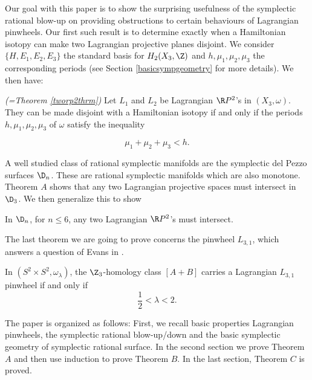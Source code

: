 Our goal with this paper is to show the surprising usefulness of the symplectic rational blow-up on providing obstructions to certain behaviours of Lagrangian pinwheels. Our first such result is to determine exactly when a Hamiltonian isotopy can make two Lagrangian projective planes disjoint. We consider $\{H,E_1,E_2,E_3\}$ the standard basis for $H_2(X_3,\Z)$ and $h,\mu_1,\mu_2,\mu_3$ the corresponding periods (see Section \ref{basicsympgeometry} for more details).  We then have:


\begin{thrma}\emph{(=Theorem \ref{tworp2thrm})}
Let $L_1$ and $L_2$ be Lagrangian $\R P^2$'s in $(X_3,\omega)$. They can be made disjoint with a Hamiltonian isotopy if and only if the periods $h,\mu_1,\mu_2,\mu_3$ of $\omega$ satisfy the inequality

\[\mu_1+\mu_2+\mu_3<h.\]
\end{thrma}



A well studied class of rational symplectic manifolds are the symplectic del Pezzo surfaces $\D_n$. These are rational symplectic manifolds which are also monotone. Theorem $A$ shows that any two Lagrangian projective spaces must intersect in $\D_3$. We then generalize this to show

\begin{thrmb}[= Theorem \ref{delpezzothrm}]
In $\D_n$, for $n\leq 6$, any two Lagrangian $\R P^2$'s must intersect.
\end{thrmb}



The last theorem we are going to prove concerns the pinwheel $L_{3,1}$, which answers a question of Evans in \cite{evans_2023}.

\begin{thrmc}[=Theorem \ref{jquestion}]
In $(S^2\times S^2,\omega_\lambda)$, the $\Z_3$-homology class $[A+B]$ carries a Lagrangian $L_{3,1}$ pinwheel if and only if
\[\frac{1}{2}<\lambda<2.\]
\end{thrmc}

The paper is organized as follows: First, we recall basic properties Lagrangian pinwheels, the symplectic rational blow-up/down and the basic symplectic geometry of symplectic rational surface. In the second section we prove Theorem $A$ and then use induction to prove Theorem $B$. In the last section, Theorem $C$ is proved.

